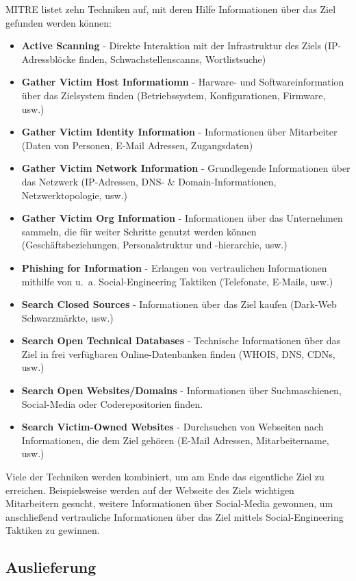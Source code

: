 \documentclass[conference]{IEEEtran}
\begin{document}
MITRE \cite{MITREReconnaissance} listet zehn Techniken auf, mit deren Hilfe Informationen über das Ziel gefunden werden können:
\begin{itemize}
    \item \textbf{Active Scanning} - Direkte Interaktion mit der Infrastruktur des Ziels (IP-Adressblöcke finden, Schwachstellenscanns, Wortlistsuche)
    \item \textbf{Gather Victim Host Informatiomn} - Harware- und Softwareinformation über das Zielsystem finden (Betriebssystem, Konfigurationen, Firmware, usw.)
    \item \textbf{Gather Victim Identity Information} - Informationen über Mitarbeiter (Daten von Personen, E-Mail Adressen, Zugangsdaten)
    \item \textbf{Gather Victim Network Information} - Grundlegende Informationen über das Netzwerk (IP-Adressen, DNS- \& Domain-Informationen, Netzwerktopologie, usw.)
    \item \textbf{Gather Victim Org Information} - Informationen über das Unternehmen sammeln, die für weiter Schritte genutzt werden können (Geschäftsbeziehungen, Personalstruktur und -hierarchie, usw.)
    \item \textbf{Phishing for Information} - Erlangen von vertraulichen Informationen mithilfe von u.~a. Social-Engineering Taktiken (Telefonate, E-Mails, usw.)
    \item \textbf{Search Closed Sources} - Informationen über das Ziel kaufen (Dark-Web Schwarzmärkte, usw.)
    \item \textbf{Search Open Technical Databases} - Technische Informationen über das Ziel in frei verfügbaren Online-Datenbanken finden (WHOIS, DNS, CDNs, usw.)
    \item \textbf{Search Open Websites/Domains} - Informationen über Suchmaschienen, Social-Media oder Coderepositorien finden.
    \item \textbf{Search Victim-Owned Websites} - Durchsuchen von Webseiten nach Informationen, die dem Ziel gehören (E-Mail Adressen, Mitarbeitername, usw.)
\end{itemize}
Viele der Techniken werden kombiniert, um am Ende das eigentliche Ziel zu erreichen.
Beispielsweise werden auf der Webseite des Ziels wichtigen Mitarbeitern gesucht, weitere Informationen über Social-Media gewonnen, um anschließend vertrauliche Informationen über das Ziel mittels Social-Engineering Taktiken zu gewinnen.

\subsection{Auslieferung}
\label{sec:proceeding:delivery}
\end{document}
